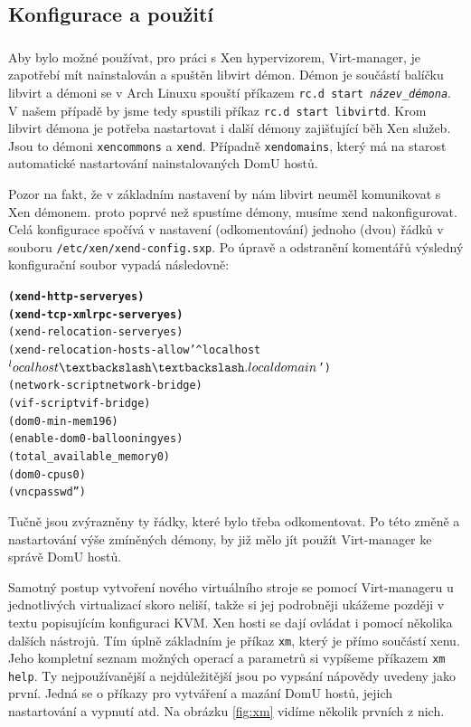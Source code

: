 \subsection{Konfigurace a použití}
\subsubsection{\xen}
Aby bylo možné používat, pro práci s Xen hypervizorem, Virt-manager, je zapotřebí mít nainstalován a spuštěn libvirt démon. Démon je součástí balíčku libvirt a démoni se v Arch Linuxu spouští příkazem \verb!rc.d start !\textit{\texttt{název}\texttt{\_}\texttt{démona}}. V našem případě by jsme tedy spustili příkaz \verb!rc.d start libvirtd!. Krom libvirt démona je potřeba nastartovat i další démony zajišťující běh Xen služeb. Jsou to démoni \texttt{xencommons} a \texttt{xend}. Případně \texttt{xendomains}, který má na starost automatické nastartování nainstalovaných DomU hostů.

Pozor na fakt, že v základním nastavení by nám libvirt neuměl komunikovat s Xen démonem. proto poprvé než spustíme démony, musíme xend nakonfigurovat. Celá konfigurace spočívá v nastavení (odkomentování) jednoho (dvou) řádků v souboru \verb!/etc/xen/xend-config.sxp!. Po úpravě a odstranění komentářů výsledný konfigurační soubor vypadá následovně:
\begin{alltt}
  \textbf{(xend-http-server yes)}
  \textbf{(xend-tcp-xmlrpc-server yes)}
  (xend-relocation-server yes)
  (xend-relocation-hosts-allow '^localhost$ ^localhost\textbackslash\textbackslash.localdomain$')
  (network-script network-bridge)
  (vif-script vif-bridge)
  (dom0-min-mem 196)
  (enable-dom0-ballooning yes)
  (total_available_memory 0) 
  (dom0-cpus 0)
  (vncpasswd '')
\end{alltt}

Tučně jsou zvýrazněny ty řádky, které bylo třeba odkomentovat. Po této změně a nastartování výše zmíněných démony, by již mělo jít použít Virt-manager ke správě DomU hostů.

Samotný postup vytvoření nového virtuálního stroje se pomocí Virt-manageru u jednotlivých virtualizací skoro neliší, takže si jej podrobněji ukážeme později v textu popisujícím konfiguraci KVM. Xen hosti se dají ovládat i pomocí několika dalších nástrojů. Tím úplně základním je příkaz \texttt{xm}, který je přímo součástí xenu. Jeho kompletní seznam možných operací a parametrů si vypíšeme příkazem \texttt{xm help}. Ty nejpoužívanější a nejdůležitější jsou po vypsání nápovědy uvedeny jako první. Jedná se o příkazy pro vytváření a mazání DomU hostů, jejich nastartování a vypnutí atd. Na obrázku \ref{fig:xm} vidíme několik prvních z nich.

